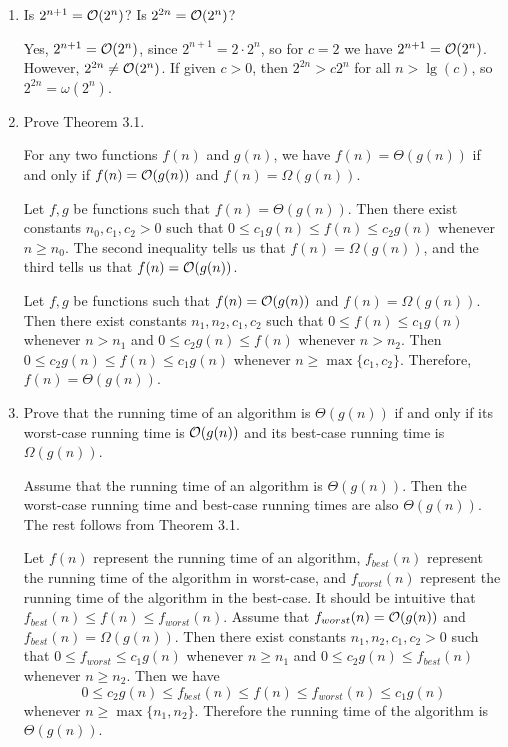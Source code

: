 \documentclass[Chapter03]{subfiles}
\begin{document}
\begin{enumerate}[leftmargin=\labelsep]
		\item Is $2^{n + 1} = \mathcal{O}(2^n)$? Is $2^{2n} = \mathcal{O}(2^n)$?
		\begin{answer}
			Yes, $2^{n + 1} = \mathcal{O}(2^n)$, since $2^{n+1} = 2\cdot 2^n$, so for $c = 2$ we have $2^{n + 1} = \mathcal{O}(2^n)$. However, $2^{2n} \neq \mathcal{O}(2^n)$. If given $c > 0$, then $2^{2n} > c2^n$ for all $n > \lg(c)$, so $2^{2n} = \omega(2^n)$.
		\end{answer}

		\item Prove Theorem 3.1.
		\begin{theorem}[Theorem 3.1]
			For any two functions $f(n)$ and $g(n)$, we have $f(n) = \Theta(g(n))$ if and only if $f(n) = \mathcal{O}(g(n))$ and $f(n) = \Omega(g(n))$.
		\end{theorem}
		\begin{answer}
			\boxed{\implies} Let $f,g$ be functions such that $f(n) = \Theta(g(n))$. Then there exist constants $n_0,c_1,c_2 > 0$ such that $0 \leq c_1g(n) \leq f(n) \leq c_2g(n)$ whenever $n \geq n_0$. The second inequality tells us that $f(n) = \Omega(g(n))$, and the third tells us that $f(n) = \mathcal{O}(g(n))$.

			\boxed{\impliedby} Let $f,g$ be functions such that $f(n) = \mathcal{O}(g(n))$ and $f(n) = \Omega(g(n))$. Then there exist constants $n_1,n_2,c_1,c_2$ such that $0 \leq f(n) \leq c_1g(n)$ whenever $n > n_1$ and $0 \leq c_2g(n) \leq f(n)$ whenever $n > n_2$. Then $0 \leq c_2g(n) \leq f(n) \leq c_1g(n)$ whenever $n \geq \max\{c_1,c_2\}$. Therefore, $f(n) = \Theta(g(n))$.
		\end{answer}

		\item Prove that the running time of an algorithm is $\Theta(g(n))$ if and only if its worst-case running time is $\mathcal{O}(g(n))$ and its best-case running time is $\Omega(g(n))$.
		\begin{answer}
			\boxed{\implies} Assume that the running time of an algorithm is $\Theta(g(n))$. Then the worst-case running time and best-case running times are also $\Theta(g(n))$. The rest follows from Theorem 3.1.

			\boxed{\impliedby} Let $f(n)$ represent the running time of an algorithm, $f_{best}(n)$ represent the running time of the algorithm in worst-case, and $f_{worst}(n)$ represent the running time of the algorithm in the best-case. It should be intuitive that $f_{best}(n) \leq f(n) \leq f_{worst}(n)$. Assume that $f_{worst}(n) = \mathcal{O}(g(n))$ and $f_{best}(n) = \Omega(g(n))$. Then there exist constants $n_1,n_2,c_1,c_2 > 0$ such that $0 \leq f_{worst} \leq c_1g(n)$ whenever $n \geq n_1$ and $0 \leq c_2g(n) \leq f_{best}(n)$ whenever $n \geq n_2$. Then we have
			\[
				0 \leq c_2g(n) \leq f_{best}(n) \leq f(n) \leq f_{worst}(n) \leq c_1g(n)
			\]
			whenever $n \geq \max\{n_1,n_2\}$. Therefore the running time of the algorithm is $\Theta(g(n))$.
		\end{answer}


\end{enumerate}
\end{document}
